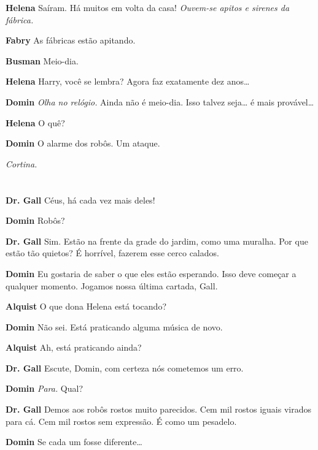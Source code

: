 \textbf{Helena} Saíram. Há muitos em volta da casa!
\emph{Ouvem-se apitos e sirenes da fábrica.}

\textbf{Fabry} As fábricas estão apitando.

\textbf{Busman} Meio-dia.

\textbf{Helena} Harry, você se lembra? Agora faz exatamente dez anos\ldots{}

\textbf{Domin} \emph{Olha no relógio.} Ainda não é meio-dia. Isso talvez seja\ldots{} é mais
provável\ldots{}

\textbf{Helena} O quê?

\textbf{Domin} O alarme dos robôs. Um ataque.

\emph{Cortina.}



\chapter[Ato \textsc{ii}]{}
\newact
\thispagestyle{empty}


\textbf{Dr. Gall} Céus, há cada vez mais deles!

\textbf{Domin} Robôs?

\textbf{Dr. Gall} Sim. Estão na frente da grade do jardim, como uma muralha. Por que estão
tão quietos? É horrível, fazerem esse cerco calados.

\textbf{Domin} Eu gostaria de saber o que eles estão esperando. Isso deve começar a qualquer momento. 
Jogamos nossa última cartada, Gall.

\textbf{Alquist} O que dona Helena está tocando?

\textbf{Domin} Não sei. Está praticando alguma música de novo.

\textbf{Alquist} Ah, está praticando ainda?

\textbf{Dr. Gall} Escute, Domin, com certeza nós cometemos um erro.

\textbf{Domin} \emph{Para.} Qual?

\textbf{Dr. Gall} Demos aos robôs rostos muito parecidos. Cem mil rostos iguais virados
para cá. Cem mil rostos sem expressão. É como um pesadelo.

\textbf{Domin} Se cada um fosse diferente\ldots{}

